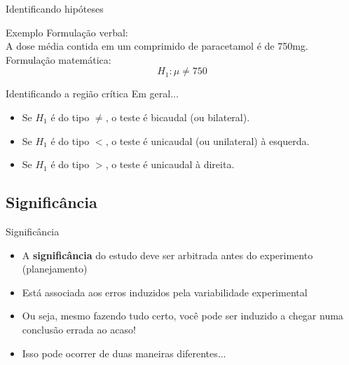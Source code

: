 \documentclass{beamer}
\begin{document}
\begin{frame}{Identificando hipóteses}
  \begin{exampleblock}{Exemplo}
    Formulação verbal:\\
    A dose média contida em um comprimido de paracetamol é de 750mg.\\
    \bigskip
    Formulação matemática:\\
    \begin{displaymath}
      H_1: \mu \ne 750
    \end{displaymath}
  \end{exampleblock}
  \begin{center}
  \end{center}
\end{frame}

\begin{frame}{Identificando a região crítica}
  Em geral...
  \begin{itemize}
  \item Se $H_1$ é do tipo $\ne$, o teste é bicaudal (ou bilateral).
  \item Se $H_1$ é do tipo $<$, o teste é unicaudal (ou unilateral) à esquerda.
  \item Se $H_1$ é do tipo $>$, o teste é unicaudal à direita.
  \end{itemize}
\end{frame}

\subsection{Significância}
\begin{frame}{Significância}
  \begin{itemize}
  \item A {\bf significância} do estudo deve ser arbitrada antes do experimento (planejamento)
  \item Está associada aos erros induzidos pela variabilidade experimental
  \item Ou seja, mesmo fazendo tudo certo, você pode ser induzido a chegar numa conclusão errada ao acaso!
  \item Isso pode ocorrer de duas maneiras diferentes...
  \end{itemize}
\end{frame}
\end{document}
